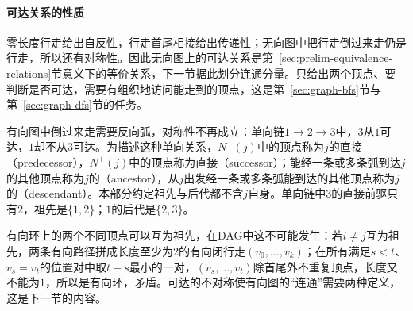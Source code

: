 \paragraph{可达关系的性质}
零长度行走给出自反性，行走首尾相接给出传递性；无向图中把行走倒过来走仍是行走，所以还有对称性。因此无向图上的可达关系是第~\ref{sec:prelim-equivalence-relations}节意义下的等价关系，下一节据此划分连通分量。只给出两个顶点、要判断是否可达，需要有组织地访问能走到的顶点，这是第~\ref{sec:graph-bfs}节与第~\ref{sec:graph-dfs}节的任务。

有向图中倒过来走需要反向弧，对称性不再成立：单向链$1\to2\to3$中，$3$从$1$可达，$1$却不从$3$可达。为描述这种单向关系，$N^-(j)$中的顶点称为$j$的直接（predecessor），$N^+(j)$中的顶点称为直接（successor）；能经一条或多条弧到达$j$的其他顶点称为$j$的（ancestor），从$j$出发经一条或多条弧能到达的其他顶点称为$j$的（descendant）。本部分约定祖先与后代都不含$j$自身。单向链中$3$的直接前驱只有$2$，祖先是$\{1,2\}$；$1$的后代是$\{2,3\}$。

有向环上的两个不同顶点可以互为祖先，在DAG中这不可能发生：若$i\neq j$互为祖先，两条有向路径拼成长度至少为$2$的有向闭行走$(v_0,\ldots,v_k)$；在所有满足$s<t$、$v_s=v_t$的位置对中取$t-s$最小的一对，$(v_s,\ldots,v_t)$除首尾外不重复顶点，长度又不能为$1$，所以是有向环，矛盾。可达的不对称使有向图的“连通”需要两种定义，这是下一节的内容。
